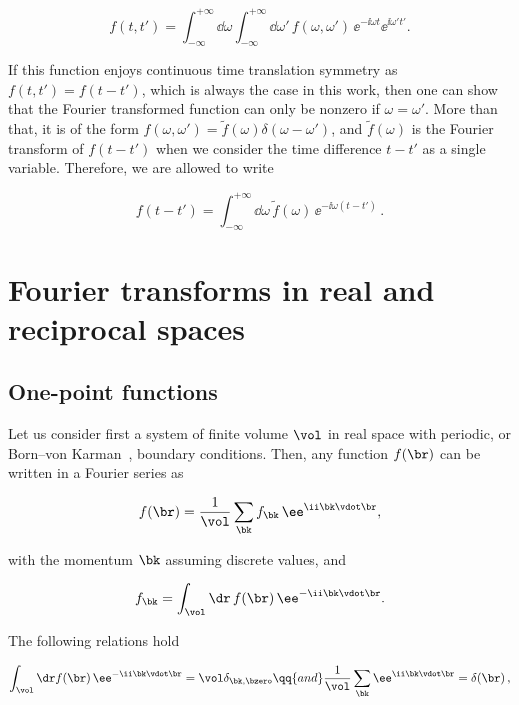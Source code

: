 \begin{equation}
    f(t,t')=\int_{-\infty}^{+\infty}\dd \omega\int_{-\infty}^{+\infty}\dd \omega'\,f(\omega,\omega')\,\ee^{-\ii\omega t}\ee^{\ii\omega't'}.
\end{equation}

\noindent If this function enjoys continuous time translation symmetry as $f(t,t')=f(t-t')$, which is always the case in this work, then one can show that the Fourier transformed function can only be nonzero if $\omega=\omega'$.
More than that, it is of the form $f(\omega,\omega')=\widetilde{f}(\omega)\delta(\omega-\omega')$, and $\widetilde{f}(\omega)$ is the Fourier transform of $f(t-t')$ when we consider the time difference $t-t'$ as a single variable.
Therefore, we are allowed to write

\begin{equation}
    f(t-t')=\int_{-\infty}^{+\infty}\dd \omega\,\widetilde{f}(\omega)\,\ee^{-\ii\omega(t-t')}\,.
\end{equation}


\section{Fourier transforms in real and reciprocal spaces}

\subsection{One-point functions}

Let us consider first a system of finite volume $\vol$ in real space with periodic, or Born--von Karman~\cite{Simon_Oxford_2013}, boundary conditions.
Then, any function $f(\br)$ can be written in a Fourier series as

\begin{equation}
    \label{eq:inverse_Fourier_discrete}
    f(\br)=\frac{1}{\vol}\sum_{\bk}f_{\bk}\,\ee^{\ii \bk \vdot \br},
\end{equation}

\noindent with the momentum $\bk$ assuming discrete values, and

\begin{equation}
    \label{eq:direct_Fourier_discrete}
    f_{\bk}=\int_{\vol}\dr\,f(\br)\,\ee^{-\ii \bk \vdot \br}.
\end{equation}

\noindent The following relations hold

\begin{equation}
    \int_{\vol}\dr f(\br)\,\ee^{-\ii \bk \vdot \br}=\vol\delta_{\bk,\bzero} \qq{and} \frac{1}{\vol}\sum_{\bk}\ee^{\ii \bk \vdot \br}=\delta(\br)\,,
\end{equation}


